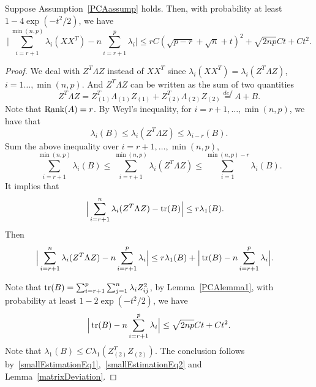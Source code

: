 \begin{theorem}\label{PCAsigma}
    Suppose Assumption~\ref{PCAassump} holds. Then, with probability at least $1-4\exp(-t^2/2)$, we have
    $$\Big|\sum_{i=r+1}^{\min(n,p)}\lambda_i(XX^T)-n\sum_{i=r+1}^p \lambda_i\Big|\leq rC (\sqrt{p-r}+\sqrt{n}+t)^2+\sqrt{2np}Ct +C t^2.$$
\end{theorem}
\begin{proof}
     We deal with $Z^T \Lambda Z$ instead of $XX^T$ since $\lambda_i(X X^T)=\lambda_i (Z^T \Lambda Z)$, $i=1\ldots,\min(n,p)$.
    And $Z^T \Lambda Z$ can be written as the sum of two quantities
    $$
 Z^T \Lambda Z=
    Z_{(1)}^T \Lambda_{(1)}Z_{(1)}+Z_{(2)}^T \Lambda_{(2)}Z_{(2)}
    \overset{def}{=}A+B.
    $$
      Note that $\operatorname{Rank}(A)=r$. By Weyl's inequality, for $i=r+1,\ldots, \min(n,p)$, we have that
    $$
    \lambda_i(B) \leq \lambda_i(Z^T \Lambda Z)\leq
    \lambda_{i-r}(B).
    $$
    Sum the above inequality over $i=r+1,\ldots, \min(n,p)$,
    $$
    \sum_{i=r+1}^{\min(n,p)}\lambda_i(B) \leq \sum_{i=r+1}^{\min(n,p)}\lambda_i(Z^T \Lambda Z)\leq
    \sum_{i=1}^{\min(n,p)-r}\lambda_{i}(B).
    $$
     It implies that
     \begin{equation*}
         \begin{aligned}
             &\Big|\sum_{i=r+1}^{n}\lambda_i(Z^T \Lambda Z)- \operatorname{tr} (B)\Big|
             \leq  r \lambda_1 (B).
         \end{aligned}
     \end{equation*}
     Then
     \begin{equation}\label{smallEstimationEq1}
         \begin{aligned}
             &\Big|\sum_{i=r+1}^{n}\lambda_i(Z^T \Lambda Z)- n\sum_{i=r+1}^p \lambda_i \Big|
             \leq  r \lambda_1 (B)+\Big|\operatorname{tr} (B)-n\sum_{i=r+1}^p \lambda_i\Big|.
         \end{aligned}
     \end{equation}

     Note that $\operatorname{tr}(B)=\sum_{i=r+1}^p \sum_{j=1}^n \lambda_i Z_{ij}^2$, by Lemma~\ref{PCAlemma1}, with probability at least $1-2\exp(-t^2/2)$, we have
     \begin{equation}\label{smallEstimationEq2}
     \Big|\operatorname{tr}(B)-n\sum_{i=r+1}^p \lambda_i\Big|\leq \sqrt{2np}Ct+ Ct^2.
     \end{equation}
     Note that $\lambda_1(B)\leq C \lambda_1(Z_{(2)}^T Z_{(2)})$. The conclusion follows by~\eqref{smallEstimationEq1},~\eqref{smallEstimationEq2} and Lemma~\ref{matrixDeviation}.


\end{proof}

